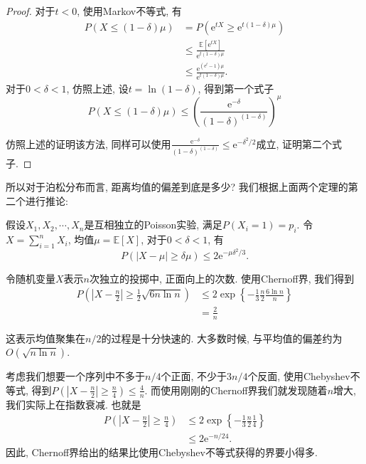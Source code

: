 \begin{proof}
    对于$t<0$, 使用Markov不等式, 有
    $$
\begin{aligned}
P(X \leq(1-\delta) \mu) & =P\left(\mathrm{e}^{t X} \geq \mathrm{e}^{t(1-\delta) \mu}\right) \\
& \leq \frac{\mathbb{E}\left[\mathrm{e}^{t X}\right]}{\mathrm{e}^{t(1-\delta) \mu}} \\
& \leq \frac{\mathrm{e}^{\left(\mathrm{e}^t-1\right) \mu}}{\mathrm{e}^{t(1-\delta) \mu}} .
\end{aligned}
$$
对于$0<\delta<1$, 仿照上述, 设$t=\ln(1-\delta)$, 得到第一个式子
$$
P(X \leq(1-\delta) \mu) \leq\left(\frac{\mathrm{e}^{-\delta}}{(1-\delta)^{(1-\delta)}}\right)^\mu
$$

仿照上述的证明该方法, 同样可以使用$\frac{\mathrm{e}^{-\delta}}{(1-\delta)^{(1-\delta)}} \leq \mathrm{e}^{-\delta^2 / 2}$成立, 证明第二个式子. 

\end{proof}

所以对于泊松分布而言, 距离均值的偏差到底是多少? 我们根据上面两个定理的第二个进行推论: 
\begin{corollary}
    假设$X_1, X_2, \cdots, X_n$是互相独立的Poisson实验, 满足$P\left(X_i=1\right)=p_i$. 令$X=\sum_{i=1}^n X_i$, 均值$\mu=\mathbb{E}[X]$, 对于$0<\delta<1$, 有
    $$P(|X-\mu| \geq \delta \mu) \leq 2 \mathrm{e}^{-\mu \delta^2 / 3}.$$
\end{corollary}

\begin{example}[投硬币]
    令随机变量$X$表示$n$次独立的投掷中, 正面向上的次数. 使用Chernoff界, 我们得到
    $$\begin{aligned} P\left(\left|X-\frac{n}{2}\right| \geq \frac{1}{2} \sqrt{6 n \ln n}\right) & \leq 2 \exp \left\{-\frac{1}{3} \frac{n}{2} \frac{6 \ln n}{n}\right\} \\ & =\frac{2}{n}\end{aligned}$$

    这表示均值聚集在$n/2$的过程是十分快速的. 大多数时候, 与平均值的偏差约为$O(\sqrt{n\ln n})$.

    考虑我们想要一个序列中不多于$n/4$个正面, 不少于$3n/4$个反面, 使用Chebyshev不等式, 得到$P\left(\left|X-\frac{n}{2}\right| \geq \frac{n}{4}\right) \leq \frac{4}{n}$. 而使用刚刚的Chernoff界我们就发现随着$n$增大, 我们实际上在指数衰减. 也就是
    $$
\begin{aligned}
P\left(\left|X-\frac{n}{2}\right| \geq \frac{n}{4}\right) & \leq 2 \exp \left\{-\frac{1}{3} \frac{n}{2} \frac{1}{4}\right\} \\
& \leq 2 \mathrm{e}^{-n / 24} .
\end{aligned}
$$
因此, Chernoff界给出的结果比使用Chebyshev不等式获得的界要小得多. 
    
\end{example}

